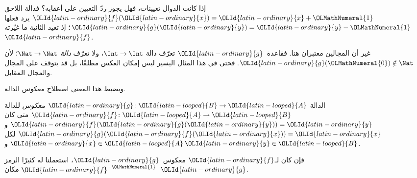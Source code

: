 \documentclass[../../../include/open-logic-section]{subfiles}
\begin{document}

\begin{explain}
إذا كانت الدوال تعيينات، فهل يجوز ردّ التعيين على أعقابه؟
فدالة اللاحق ${\OLId{latin-ordinary}{f}}({\OLId{latin-ordinary}{x}}) = {\OLId{latin-ordinary}{x}} + {\OLMathNumeral{1}}$ يرد فعلها ${\OLId{latin-ordinary}{g}}({\OLId{latin-ordinary}{y}}) = {\OLId{latin-ordinary}{y}} - {\OLMathNumeral{1}}$؛ إذ
تعيد الثانية ما غيّرته~${\OLId{latin-ordinary}{f}}$.

غير أن المجالين معتبران هنا. فقاعدة~${\OLId{latin-ordinary}{g}}$ تعرّف دالة
$\Int \to \Int$، ولا تعرّف \emph{دالة} $\Nat
\to \Nat$؛ لأن ${\OLId{latin-ordinary}{g}}({\OLMathNumeral{0}}) \notin \Nat$. فحتى في هذا المثال اليسير
ليس إمكان العكس مطلقًا، بل قد يتوقف على المجال والمجال المقابل.

ويضبط هذا المعنى اصطلاح معكوس الدالة.
\end{explain}

\begin{defn}
الدالة ${\OLId{latin-ordinary}{g}} \colon {\OLId{latin-looped}{B}} \to {\OLId{latin-looped}{A}}$ \emph{معكوس} للدالة ${\OLId{latin-ordinary}{f}}
\colon {\OLId{latin-looped}{A}} \to {\OLId{latin-looped}{B}}$ متى كان ${\OLId{latin-ordinary}{f}}({\OLId{latin-ordinary}{g}}({\OLId{latin-ordinary}{y}})) = {\OLId{latin-ordinary}{y}}$ و${\OLId{latin-ordinary}{g}}({\OLId{latin-ordinary}{f}}({\OLId{latin-ordinary}{x}})) = {\OLId{latin-ordinary}{x}}$ لكل
${\OLId{latin-ordinary}{x}} \in {\OLId{latin-looped}{A}}$ و${\OLId{latin-ordinary}{y}} \in {\OLId{latin-looped}{B}}$.
\end{defn}

فإن كان لـ${\OLId{latin-ordinary}{f}}$ معكوس~${\OLId{latin-ordinary}{g}}$، استعملنا له كثيرًا الرمز ${\OLId{latin-ordinary}{f}}^{-{\OLMathNumeral{1}}}$ مكان~${\OLId{latin-ordinary}{g}}$.
\end{document}

